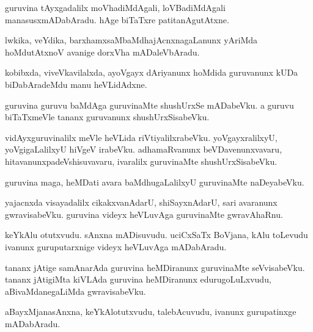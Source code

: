 \documentclass{article}
\begin{document}
\begin{mn}
guruvina tAyxgadalilx moVhadiMdAgali, loVBadiMdAgali manasusxmADabAradu. hAge biTaTxre 
patitanAgutAtxne.
\end{mn}

\begin{mn}
lwkika, veYdika, barxhamxsaMbaMdhajAcnxnagaLanunx yAriMda hoMdutAtxnoV
avanige dorxVha mADaleVbAradu.
\end{mn}

\begin{mn}
kobibxda, viveVkavilalxda, ayoVgayx dAriyanunx hoMdida guruvanunx kUDa biDabAradeMdu manu 
heVLidAdxne.
\end{mn}

\begin{mn}
guruvina guruvu baMdAga guruvinaMte shushUrxSe mADabeVku. a guruvu biTaTxmeVle tananx 
guruvanunx shushUrxSisabeVku.
\end{mn}

\begin{mn}
vidAyxguruvinalilx  meVle heVLida riVtiyalilxrabeVku. yoVgayxralilxyU, yoVgigaLalilxyU hiVgeV 
irabeVku. adhamaRvanunx beVDavenunxvavaru, hitavanunxpadeVshisuvavaru, ivaralilx guruvinaMte 
shushUrxSisabeVku.
\end{mn}

\begin{mn}
guruvina maga, heMDati avara baMdhugaLalilxyU guruvinaMte naDeyabeVku.
\end{mn}

\begin{mn}
yajacnxda visayadalilx cikakxvanAdarU, shiSayxnAdarU, sari avaranunx gwravisabeVku. guruvina 
videyx heVLuvAga guruvinaMte gwravAhaRnu.
\end{mn}

\begin{mn}
keYkAlu otutxvudu. sAnxna mADisuvudu. uciCxSaTx BoVjana, kAlu toLevudu ivanunx guruputarxnige 
videyx heVLuvAga mADabAradu.
\end{mn}

\begin{mn}
tananx jAtige samAnarAda guruvina heMDiranunx guruvinaMte seVvisabeVku. tananx jAtigiMta kiVLAda 
guruvina heMDiranunx edurugoLuLxvudu, aBivaMdanegaLiMda gwravisabeVku.
\end{mn}

\begin{mn}
aBayxMjanasAnxna, keYkAlotutxvudu, talebAcuvudu, ivanunx gurupatinxge mADabAradu.
\end{mn}
\end{document}
